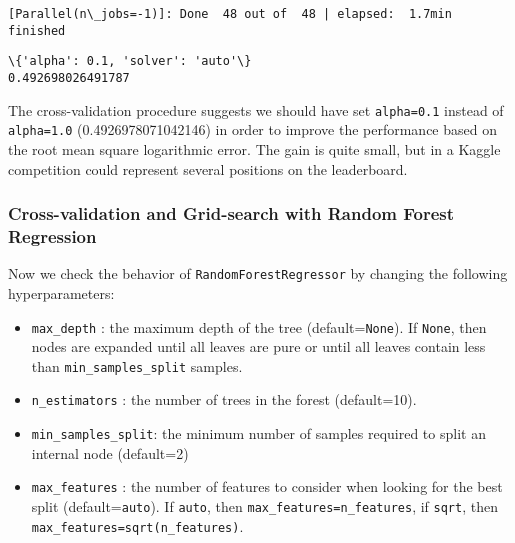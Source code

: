 \documentclass[11pt]{article}
\providecommand{\tightlist}{%
      \setlength{\itemsep}{0pt}\setlength{\parskip}{0pt}}
\begin{document}
{    \begin{Verbatim}[commandchars=\\\{\}]
[Parallel(n\_jobs=-1)]: Done  48 out of  48 | elapsed:  1.7min finished
    \end{Verbatim}

    \begin{Verbatim}[commandchars=\\\{\}]
\{'alpha': 0.1, 'solver': 'auto'\}
0.492698026491787
    \end{Verbatim}

    The cross-validation procedure suggests we should have set
\texttt{alpha=0.1} instead of \texttt{alpha=1.0} (0.4926978071042146) in
order to improve the performance based on the root mean square
logarithmic error. The gain is quite small, but in a Kaggle competition
could represent several positions on the leaderboard.

    \subsubsection{Cross-validation and Grid-search with Random Forest
Regression}\label{cross-validation-and-grid-search-with-random-forest-regression}

\hspace{0.5cm} Now we check the behavior of \texttt{RandomForestRegressor} by changing
the following hyperparameters:

\begin{itemize}
\tightlist
\item
  \texttt{max\_depth} : the maximum depth of the tree
  (default=\texttt{None}). If \texttt{None}, then nodes are expanded
  until all leaves are pure or until all leaves contain less than
  \texttt{min\_samples\_split} samples.
\item
  \texttt{n\_estimators} : the number of trees in the forest
  (default=10).
\item
  \texttt{min\_samples\_split}: the minimum number of samples required
  to split an internal node (default=2)
\item
  \texttt{max\_features} : the number of features to consider when
  looking for the best split (default=\texttt{auto}). If \texttt{auto},
  then \texttt{max\_features=n\_features}, if \texttt{sqrt}, then
  \texttt{max\_features=sqrt(n\_features)}.
\end{itemize}

}
\end{document}
